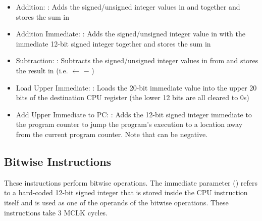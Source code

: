 \documentclass[11pt,pdftex,portrait,letterpaper]{article}
\begin{document}
\begin{itemize}
	\item Addition: : Adds the signed/unsigned integer values in  and  together and stores the sum in 
	\item Addition Immediate: : Adds the signed/unsigned integer value in  with the immediate 12-bit signed integer  together and stores the sum in 
	\item Subtraction: : Subtracts the signed/unsigned integer values in  from  and stores the result in  (i.e.  $\leftarrow$  $-$ )
	\item Load Upper Immediate: : Loads the 20-bit immediate value  into the upper 20 bits of the destination CPU register  (the lower 12 bits are all cleared to 0s)
	\item Add Upper Immediate to PC: : Adds the 12-bit signed integer immediate  to the program counter to jump the program's execution to a location  away from the current program counter. Note that  can be negative.
\end{itemize}

\subsection{Bitwise Instructions}

These instructions perform bitwise operations. The immediate parameter () refers to a hard-coded 12-bit signed integer that is stored inside the CPU instruction itself and is used as one of the operands of the bitwise operations. These instructions take 3 MCLK cycles.
\end{document}
